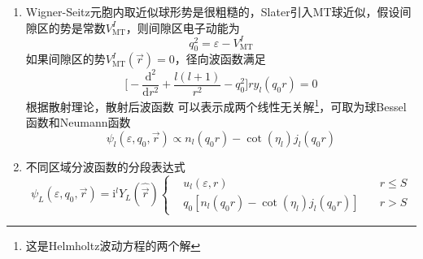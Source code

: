 {{\begin{enumerate}
				对于给定的$\varepsilon$%
				要求波函数在每个\textrm{Wigner-Seitz}元胞表面上连续到一阶。

在原子球近似\textrm{(ASA)}下，该连续条件简化为要求径向分波$u_l(\varepsilon,r)$在球面$r=S$位置的对数导数$D_l(\varepsilon)$连续
	\begin{displaymath}
		D_l(\varepsilon)\equiv S\dfrac{u_l^{\prime}(\varepsilon,S)}{u_l(\varepsilon,S)}
	\end{displaymath}
	其中球半径取为$S=\sqrt[3]{\frac{3\Omega_0}{4\pi}}$，$\Omega_0$是\textrm{Weiger-Seitz}元胞

\item \textrm{Wigner-Seitz}元胞内取近似球形势是很粗糙的，\textrm{Slater}引入\textrm{MT}球近似，假设间隙区的势是常数$V_{\mathrm{MT}}^I$，则间隙区电子动能为
				\begin{displaymath}
					q_0^2=\varepsilon-V_{\mathrm{MT}}^I
				\end{displaymath}
				如果间隙区的势$V_{\mathrm{MT}}^I(\vec r)=0$，径向波函数满足
				\begin{displaymath}
					\bigg[-\dfrac{\mathrm{d}^2}{\mathrm{d}r^2}+\dfrac{l(l+1)}{r^2}-q_0^2\bigg]ry_l(q_0r)=0
				\end{displaymath}
				根据散射理论，散射后波函数%
				可以表示成两个线性无关解\footnote{\tiny{这是\textrm{Helmholtz}}波动方程的两个解}，可取为球\textrm{Bessel}函数和\textrm{Neumann}函数
				\begin{displaymath}
					\psi_l(\varepsilon,q_0,\vec r)\propto n_l(q_0r)-\cot(\eta_l)j_l(q_0r) 
				\end{displaymath}
			\item 不同区域分波函数的分段表达式
				\begin{displaymath}
					\psi_L(\varepsilon,q_0,\vec r)=\mathrm{i}^{l}Y_L(\hat{\vec r})\left\{
						\begin{aligned}
							&u_l(\varepsilon,r)\quad &r\leqslant S\\
							&q_0[n_l(q_0r)-\cot(\eta_l)j_l(q_0r)]\quad &r>S

\end{aligned}
\end{displaymath}
\end{enumerate}}}
